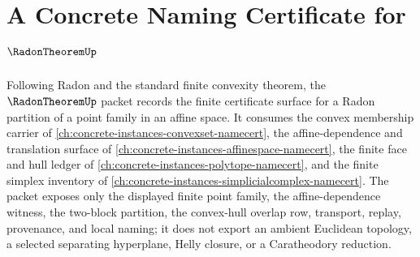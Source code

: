 \chapter{A Concrete Naming Certificate for $\RadonTheoremUp$}
\label{ch:concrete-instances-radon-theorem-namecert}

Following Radon and the standard finite convexity theorem, the $\RadonTheoremUp$ packet records the finite certificate surface for a Radon partition of a point family in an affine space. It consumes the convex membership carrier of \autoref{ch:concrete-instances-convexset-namecert}, the affine-dependence and translation surface of \autoref{ch:concrete-instances-affinespace-namecert}, the finite face and hull ledger of \autoref{ch:concrete-instances-polytope-namecert}, and the finite simplex inventory of \autoref{ch:concrete-instances-simplicialcomplex-namecert}. The packet exposes only the displayed finite point family, the affine-dependence witness, the two-block partition, the convex-hull overlap row, transport, replay, provenance, and local naming; it does not export an ambient Euclidean topology, a selected separating hyperplane, Helly closure, or a Caratheodory reduction.

